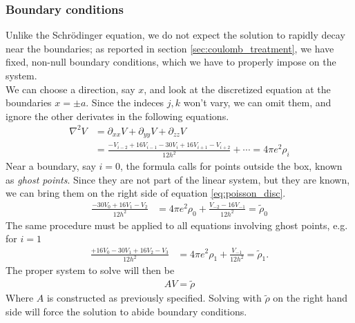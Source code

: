 \subsubsection{Boundary conditions}
Unlike the Schr\"odinger equation, we do not expect the solution to rapidly decay near the boundaries; as reported in section \ref{sec:coulomb_treatment}, we have fixed, non-null boundary conditions, which we have to properly impose on the system.
\\We can choose a direction, say $x$, and look at the discretized equation at the boundaries $x=\pm a$. Since the indeces $j,k$ won't vary, we can omit them, and ignore the other derivates in the following equations.
\begin{align}
    \label{eq:poisson_disc}
    \nabla^2 V &= \partial_{xx} V + \partial_{yy}V + \partial_{zz}V\nonumber \\
    &= \frac{-V_{i-2} + 16V_{i-1} -30V_i + 16V_{i+1} - V_{i+2}}{12h^2}+\cdots=4\pi e^2 \rho_i
\end{align}
Near a boundary, say $i = 0$, the formula calls for points outside the box, known as \textit{ghost points}. Since they are not part of the linear system, but they are known, we can bring them on the right side of equation \ref{eq:poisson_disc}.
\begin{align}
    \frac{-30 V_0 + 16 V_1 - V_2 }{12h^2} &= 4\pi e^2 \rho_0 +\frac{ V_{-2} -16V_{-1}}{12h^2} = \tilde\rho_0
\end{align}
The same procedure must be applied to all equations involving ghost points, e.g. for $i=1$
\begin{align}
    \frac{+16V_0 -30V_{1} + 16 V_2 - V_3}{12h^2} &= 4\pi e^2 \rho_1 + \frac{V_{-1} }{12h^2} = \tilde\rho_1.
\end{align}
The proper system to solve will then be
\begin{align}
A V = \tilde \rho
\end{align}
Where $A$ is constructed as previously specified. Solving with $\tilde \rho $ on the right hand side will force the solution to abide boundary conditions.
